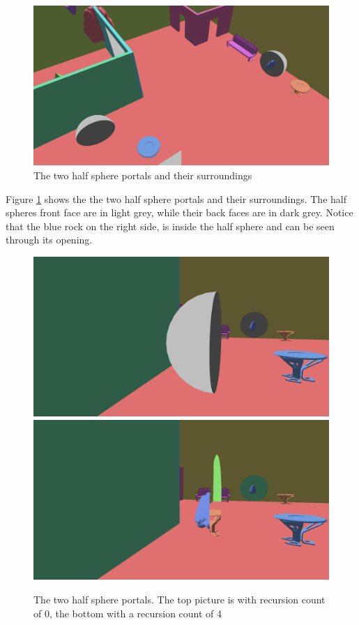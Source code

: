 \begin{figure}[H]
	\includegraphics[width=\linewidth]{images/nonplanarlayout.png}
	\caption{The two half sphere portals and their surroundings}
	\label{fig:nonplanarlayout}
\end{figure}

Figure \ref{fig:nonplanarlayout} shows the the two half sphere portals and their surroundings. The half spheres front face are in light grey, while their back faces are in dark grey. Notice that the blue rock on the right side, is inside the half sphere and can be seen through its opening.

\begin{figure}[H]
	\includegraphics[width=\linewidth]{images/NonPlanarR0.png}
	\includegraphics[width=\linewidth]{images/nonplanar.png}
	\caption{The two half sphere portals. The top picture is with recursion count of 0, the bottom with a recursion count of 4}
	\label{fig:nonplanar}
\end{figure}

